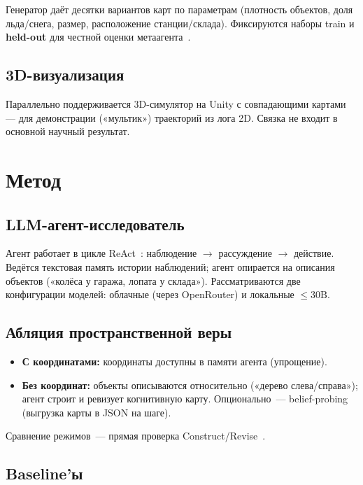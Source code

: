 \documentclass[11pt,a4paper]{article}
\begin{document}
Генератор даёт десятки вариантов карт по параметрам (плотность объектов,
доля льда/снега, размер, расположение станции/склада).
Фиксируются наборы train и \textbf{held-out} для честной оценки
метаагента~\cite{deitke2022procthor}.

\subsection{3D-визуализация}

Параллельно поддерживается 3D-симулятор на Unity с совпадающими картами~
--- для демонстрации («мультик») траекторий из лога 2D.
Связка не входит в основной научный результат.

\section{Метод}
\label{sec:method}

\subsection{LLM-агент-исследователь}

Агент работает в цикле ReAct~\cite{yao2022react}:
наблюдение \(\to\) рассуждение \(\to\) действие.
Ведётся текстовая память истории наблюдений; агент опирается на описания
объектов («колёса у гаража, лопата у склада»).
Рассматриваются две конфигурации моделей: облачные (через OpenRouter)
и локальные \(\le 30\mathrm{B}\).

\subsection{Абляция пространственной веры}

\begin{itemize}[leftmargin=*]
  \item \textbf{С координатами:} координаты доступны в памяти агента (упрощение).
  \item \textbf{Без координат:} объекты описываются относительно
        («дерево слева/справа»); агент строит и ревизует когнитивную карту.
        Опционально~--- belief-probing (выгрузка карты в JSON на шаге).
\end{itemize}
Сравнение режимов~--- прямая проверка Construct/Revise~\cite{theoryofspace2026}.

\subsection{Baseline'ы}
\end{document}
